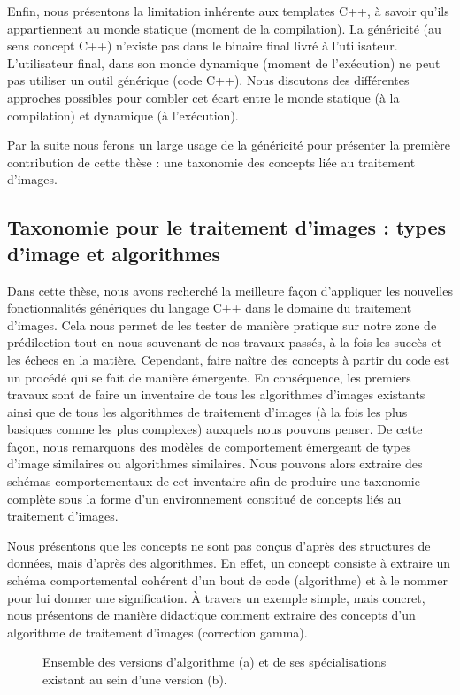Enfin, nous présentons la limitation inhérente aux templates C++, à savoir qu'ils appartiennent au monde statique
(moment de la compilation). La généricité (au sens concept C++) n'existe pas dans le binaire final livré à
l'utilisateur. L'utilisateur final, dans son monde dynamique (moment de l'exécution) ne peut pas utiliser un outil
générique (code C++). Nous discutons des différentes approches possibles pour combler cet écart entre le monde statique
(à la compilation) et dynamique (à l'exécution).

Par la suite nous ferons un large usage de la généricité pour présenter la première contribution de cette thèse : une
taxonomie des concepts liée au traitement d'images.


\subsection*{Taxonomie pour le traitement d'images : types d'image et algorithmes}


Dans cette thèse, nous avons recherché la meilleure façon d'appliquer les nouvelles fonctionnalités génériques du
langage C++ dans le domaine du traitement d'images. Cela nous permet de les tester de manière pratique sur notre zone de
prédilection tout en nous souvenant de nos travaux passés, à la fois les succès et les échecs en la matière. Cependant,
faire naître des concepts à partir du code est un procédé qui se fait de manière émergente. En conséquence, les premiers
travaux sont de faire un inventaire de tous les algorithmes d'images existants ainsi que de tous les algorithmes de
traitement d'images (à la fois les plus basiques comme les plus complexes) auxquels nous pouvons penser. De cette façon,
nous remarquons des modèles de comportement émergeant de types d'image similaires ou algorithmes similaires. Nous
pouvons alors extraire des schémas comportementaux de cet inventaire afin de produire une taxonomie complète sous la
forme d'un environnement constitué de concepts liés au traitement d'images.

Nous présentons que les concepts ne sont pas conçus d'après des structures de données, mais d'après des algorithmes. En
effet, un concept consiste à extraire un schéma comportemental cohérent d'un bout de code (algorithme) et à le nommer
pour lui donner une signification. \`{A} travers un exemple simple, mais concret, nous présentons de manière didactique
comment extraire des concepts d'un algorithme de traitement d'images (correction gamma).

\begin{figure}[htbp]
  \centering
  \hfil
  \caption[]{Ensemble des versions d'algorithme (a) et de ses spécialisations existant au sein d'une version (b).}
  \label{resume:fig:image.version.vs.specialization}
\end{figure}

